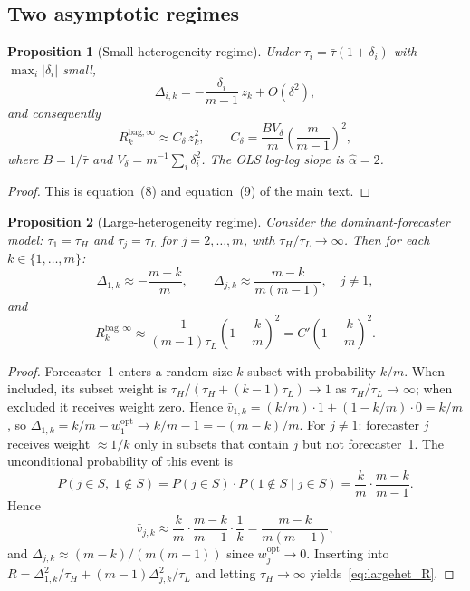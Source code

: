 \documentclass[12pt]{article}
\newtheorem{proposition}{Proposition}
\theoremstyle{definition}
\begin{document}
\subsection{Two asymptotic regimes}

\begin{proposition}[Small-heterogeneity regime]\label{prop:smallhet}
  Under $\tau_i = \bar\tau(1+\delta_i)$ with $\max_i|\delta_i|$ small,
  \[
    \Delta_{i,k} = -\frac{\delta_i}{m-1}\,z_k + O(\delta^2),
  \]
  and consequently
  \[
    R_k^{\mathrm{bag},\infty} \approx C_\delta\,z_k^2,
    \qquad
    C_\delta = \frac{BV_\delta}{m}\!\left(\frac{m}{m-1}\right)^{\!2},
  \]
  where $B = 1/\bar\tau$ and $V_\delta = m^{-1}\sum_i\delta_i^2$. The OLS log-log slope is
  $\hat\alpha = 2$.
\end{proposition}

\begin{proof}
  This is equation~(8) and equation~(9) of the main text.
\end{proof}

\begin{proposition}[Large-heterogeneity regime]\label{prop:largehet}
  Consider the dominant-forecaster model: $\tau_1 = \tau_H$ and
  $\tau_j = \tau_L$ for $j = 2,\ldots,m$, with $\tau_H/\tau_L \to \infty$.
  Then for each $k \in \{1,\ldots,m\}$:
  \[
    \Delta_{1,k} \approx -\frac{m-k}{m},
    \qquad
    \Delta_{j,k} \approx \frac{m-k}{m(m-1)}, \quad j \neq 1,
  \]
  and
  \begin{equation}\label{eq:largehet_R}
    R_k^{\mathrm{bag},\infty}
    \approx \frac{1}{(m-1)\tau_L}\!\left(1 - \frac{k}{m}\right)^{\!2}
    = C'\!\left(1 - \frac{k}{m}\right)^{\!2}.
  \end{equation}
\end{proposition}

\begin{proof}
  Forecaster~1 enters a random size-$k$ subset with probability $k/m$.
  When included, its subset weight is $\tau_H/(\tau_H + (k-1)\tau_L) \to 1$ as
  $\tau_H/\tau_L \to \infty$; when excluded it receives weight zero.
  Hence $\bar v_{1,k} = (k/m)\cdot 1 + (1-k/m)\cdot 0 = k/m$,
  so $\Delta_{1,k} = k/m - w_1^{\mathrm{opt}} \to k/m - 1 = -(m-k)/m$.
  For $j\neq 1$: forecaster $j$ receives weight $\approx 1/k$ only in subsets that contain
  $j$ but not forecaster~1.  The unconditional probability of this event is
  \[
    P(j \in S,\; 1 \notin S)
    = P(j \in S) \cdot P(1 \notin S \mid j \in S)
    = \frac{k}{m} \cdot \frac{m-k}{m-1}.
  \]
  Hence
  \[
    \bar v_{j,k}
    \approx \frac{k}{m}\cdot\frac{m-k}{m-1}\cdot\frac{1}{k}
    = \frac{m-k}{m(m-1)},
  \]
  and $\Delta_{j,k} \approx (m-k)/(m(m-1))$ since $w_j^{\mathrm{opt}} \to 0$.
  Inserting into $R = \Delta_{1,k}^2/\tau_H + (m-1)\Delta_{j,k}^2/\tau_L$
  and letting $\tau_H \to \infty$ yields~\eqref{eq:largehet_R}.
\end{proof}
\end{document}
